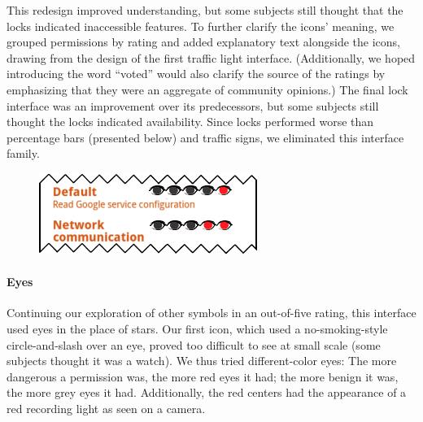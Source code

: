 \documentclass[11pt]{article}
\newcommand{\refsec}[1]{Section~\ref{#1}}
\begin{document}
This redesign improved understanding, but 
some subjects still thought that the locks indicated inaccessible features.
To further clarify the icons' meaning, we grouped 
permissions by rating and added explanatory 
text alongside the icons, drawing 
from the design of the first traffic light interface. 
(Additionally, we hoped introducing the word ``voted'' 
would also clarify the source of the ratings by emphasizing that they 
were an aggregate of community opinions.)
\label{ss-sec-locks-r4}
The final lock interface was an improvement over its 
predecessors, 
but some subjects still thought the locks indicated 
availability. Since locks 
performed worse than percentage bars (presented below)
and traffic signs, 
we eliminated this interface family.


\begin{figure}
\begin{center}
\includegraphics[width=.9\linewidth]{candidate-img/eyes/eyesR2.png}
\end{center}
\end{figure}

\paragraph{Eyes}
\label{s-sec-eyes}

Continuing our exploration of other symbols in an out-of-five rating, this 
interface used eyes in the place of stars. Our first icon, which
used a no-smoking-style circle-and-slash over an eye, 
proved too difficult to see at small scale
(some subjects thought it was a watch). We thus tried different-color eyes:
\label{ss-sec-eyes-r2}
The more dangerous a permission was, the more red eyes it had; the more
benign it was, the more grey eyes it had.
Additionally, the red centers had 
the appearance of a red recording light as seen on a camera.
\end{document}
